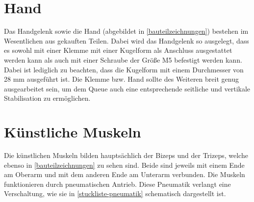 	\section{Hand}
		Das Handgelenk sowie die Hand (abgebildet in \cref{bauteilzeichnungen}) bestehen im Wesentlichen aus gekauften Teilen.
		Dabei wird das Handgelenk so ausgelegt, dass es sowohl mit einer Klemme mit einer Kugelform als Anschluss ausgestattet werden kann als auch mit einer Schraube der Größe M5 befestigt werden kann.
		Dabei ist lediglich zu beachten, dass die Kugelform mit einem Durchmesser von 28 mm ausgeführt ist.
		Die Klemme bzw. Hand sollte des Weiteren breit genug ausgearbeitet sein, um dem Queue auch eine entsprechende seitliche und vertikale Stabilisation zu ermöglichen.
	
	\section{Künstliche Muskeln}
		Die künstlichen Muskeln bilden hauptsächlich der Bizeps und der Trizeps, welche ebenso in \cref{bauteilzeichnungen} zu sehen sind.
		Beide sind jeweils mit einem Ende am Oberarm und mit dem anderen Ende am Unterarm verbunden.
		Die Muskeln funktionieren durch pneumatischen Antrieb.
		Diese Pneumatik verlangt eine Verschaltung, wie sie in \cref{stuckliste-pneumatik} schematisch dargestellt ist.
